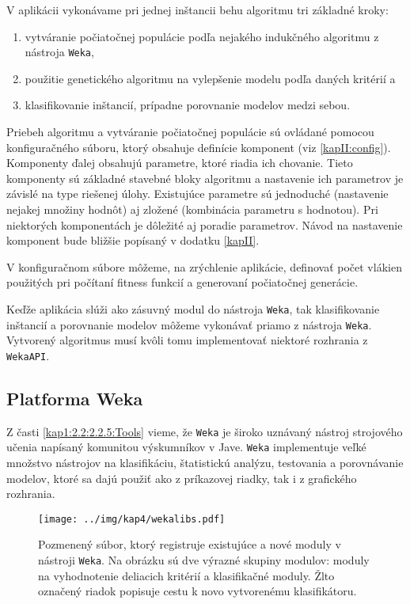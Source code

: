 V aplikácii vykonávame pri jednej inštancii behu algoritmu tri základné kroky:
\begin{enumerate}
\item vytváranie počiatočnej populácie podľa nejakého indukčného algoritmu z nástroja \verb|Weka|,
\item použitie genetického algoritmu na vylepšenie modelu podľa daných kritérií a
\item klasifikovanie inštancií, prípadne porovnanie modelov medzi sebou.
\end{enumerate}

Priebeh algoritmu a vytváranie počiatočnej populácie sú ovládané pomocou konfiguračného súboru, ktorý obsahuje definície komponent (viz \ref{kapII:config}). Komponenty ďalej obsahujú parametre, ktoré riadia ich chovanie. Tieto komponenty sú základné stavebné bloky algoritmu a nastavenie ich parametrov je závislé na type riešenej úlohy. Existujúce parametre sú jednoduché (nastavenie nejakej množiny hodnôt) aj zložené (kombinácia parametru s hodnotou). Pri niektorých komponentách je dôležité aj poradie parametrov. Návod na nastavenie komponent bude bližšie popísaný v dodatku \ref{kapII}.

V konfiguračnom súbore môžeme, na zrýchlenie aplikácie, definovať počet vlákien použitých pri počítaní fitness funkcií a generovaní počiatočnej generácie.

Keďže aplikácia slúži ako zásuvný modul do nástroja \verb|Weka|, tak klasifikovanie inštancií a porovnanie modelov môžeme vykonávať priamo z nástroja \verb|Weka|. Vytvorený algoritmus musí kvôli tomu implementovať niektoré rozhrania z \verb|WekaAPI|.

\subsection{Platforma Weka}\label{kap4:4.2:4.2.1:Weka}
Z časti \ref{kap1:2.2:2.2.5:Tools} vieme, že \verb|Weka| je široko uznávaný nástroj strojového učenia napísaný komunitou výskumníkov v Jave. \verb|Weka| implementuje veľké množstvo nástrojov na klasifikáciu, štatistickú analýzu, testovania a porovnávanie modelov, ktoré sa dajú použiť ako z príkazovej riadky, tak i z grafického rozhrania. 

\begin{figure}[h]
\centering
\centerline{\mbox{\texttt{[image: ../img/kap4/wekalibs.pdf]}}}
\caption{Pozmenený súbor, ktorý registruje existujúce a nové moduly v nástroji \texttt{Weka}. Na obrázku sú dve výrazné skupiny modulov: moduly na vyhodnotenie deliacich kritérií a klasifikačné moduly. Žlto označený riadok popisuje cestu k novo vytvorenému klasifikátoru.}\label{fig:wekalibs}
\end{figure}

